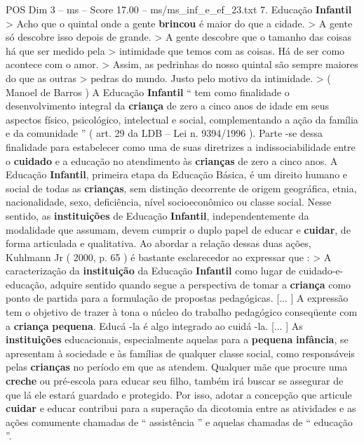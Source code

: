 \begin{textsample}{POS Dim 3 – ms – Score 17.00 – ms/ms\_inf\_e\_ef\_23.txt}  \label{ex:f3_pos_193}
7.
Educação \textbf{Infantil} > Acho que o quintal onde a gente \textbf{brincou} é maior do que a cidade. > A gente só descobre isso depois de grande. > A gente descobre que o tamanho das coisas há que ser medido pela > intimidade que temos com as coisas.
Há de ser como acontece com o amor. > Assim, as pedrinhas do nosso quintal são sempre maiores do que as outras > pedras do mundo.
Justo pelo motivo da intimidade. > ( Manoel de Barros ) A Educação \textbf{Infantil} “ tem como finalidade o desenvolvimento integral da \textbf{criança} de zero a cinco anos de idade em seus aspectos físico, psicológico, intelectual e social, complementando a ação da família e da comunidade ” ( art. 29 da LDB – Lei n. 9394/1996 ).
Parte -se dessa finalidade para estabelecer como uma de suas diretrizes a indissociabilidade entre o \textbf{cuidado} e a educação no atendimento às \textbf{crianças} de zero a cinco anos.
A Educação \textbf{Infantil}, primeira etapa da Educação Básica, é um direito humano e social de todas as \textbf{crianças}, sem distinção decorrente de origem geográfica, etnia, nacionalidade, sexo, deficiência, nível socioeconômico ou classe social.
Nesse sentido, as \textbf{instituições} de Educação \textbf{Infantil}, independentemente da modalidade que assumam, devem cumprir o duplo papel de educar e \textbf{cuidar}, de forma articulada e qualitativa.
Ao abordar a relação dessas duas ações, Kuhlmann Jr ( 2000, p. 65 ) é bastante esclarecedor ao expressar que : > A caracterização da \textbf{instituição} da Educação \textbf{Infantil} como lugar de cuidado-e-educação, adquire sentido quando segue a perspectiva de tomar a \textbf{criança} como ponto de partida para a formulação de propostas pedagógicas. [... ] A expressão tem o objetivo de trazer à tona o núcleo do trabalho pedagógico conseqüente com a \textbf{criança} \textbf{pequena}.
Educá -la é algo integrado ao cuidá -la. [... ] As \textbf{instituições} educacionais, especialmente aquelas para a \textbf{pequena} \textbf{infância}, se apresentam à sociedade e às famílias de qualquer classe social, como responsáveis pelas \textbf{crianças} no período em que as atendem.
Qualquer mãe que procure uma \textbf{creche} ou pré-escola para educar seu filho, também irá buscar se assegurar de que lá ele estará guardado e protegido.
Por isso, adotar a concepção que articule \textbf{cuidar} e educar contribui para a superação da dicotomia entre as atividades e as ações comumente chamadas de “ assistência ” e aquelas chamadas de “ educação ”.

\end{textsample}

